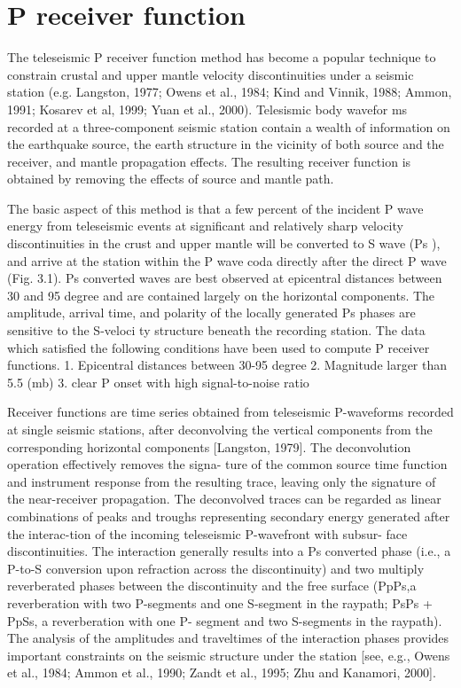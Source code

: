 \documentclass[long]{geophysics}
\begin{document}
\section{P   receiver   function}


The   teleseismic   P   receiver   function   method   has   become   a   popular  technique   to constrain   crustal   and   upper   mantle   velocity   discontinuities   under a   seismic   station (e.g.   Langston,   1977;   Owens   et   al.,   1984;   Kind   and   Vinnik,   1988;   Ammon, 1991; Kosarev   et   al,   1999;   Yuan   et   al.,   2000).  Telesismic   body   wavefor
ms   recorded   at   a three-component seismic  station  contain  a wealth  of information  on  the earthquake source, the earth structure in the vicinity of both source and the receiver, and mantle propagation   effects.   The   resulting   receiver   function   is   obtained   by   removing   the
effects of source and mantle path.

The basic aspect of this method is that a few percent of the incident P wave energy from teleseismic events at significant and relatively sharp velocity discontinuities in the crust and upper mantle will be converted to S wave (Ps
), and arrive at the station within the P wave coda directly after the direct P wave (Fig. 3.1). Ps converted waves are   best   observed   at   epicentral   distances   between   30  and   95 degree   and   are   contained largely on the horizontal components. The amplitude, arrival time, and polarity of the
locally   generated   Ps   phases   are   sensitive   to   the   S-veloci
ty   structure   beneath   the recording station. The   data   which   satisfied   the   following   conditions   have   been   used   to   compute   P
receiver functions.
       1. Epicentral distances between 30-95 degree
       2. Magnitude larger than 5.5 (mb)
       3. clear P onset with high signal-to-noise ratio

Receiver functions are time series obtained from
teleseismic P-waveforms recorded at single seismic stations,
after deconvolving the vertical components from the
corresponding horizontal components [Langston, 1979].
The deconvolution operation effectively removes the signa-
ture of the common source time function and instrument
response from the resulting trace, leaving only the signature
of the near-receiver propagation. The deconvolved traces
can be regarded as linear combinations of peaks and troughs
representing secondary energy generated after the interac-tion of the incoming teleseismic P-wavefront with subsur-
face discontinuities. The interaction generally results into a
Ps converted phase (i.e., a P-to-S conversion upon refraction
across the discontinuity) and two multiply reverberated
phases between the discontinuity and the free surface (PpPs,a reverberation with two P-segments and one S-segment in
the raypath; PsPs + PpSs, a reverberation with one P-
segment and two S-segments in the raypath). The analysis
of the amplitudes and traveltimes of the interaction phases
provides important constraints on the seismic structure
under the station [see, e.g., Owens et al., 1984; Ammon et
al., 1990; Zandt et al., 1995; Zhu and Kanamori, 2000].
\end{document}
